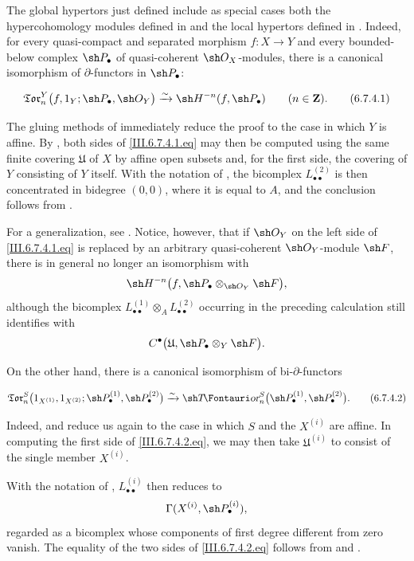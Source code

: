 \begin{remark}[6.7.4]
\label{III.6.7.4}
The global hypertors just defined include as special cases both
the hypercohomology modules defined in  and the
local hypertors defined in .  Indeed, for every
quasi-compact and separated morphism $f:X\to Y$ and every
bounded-below complex $\sh P_\bullet$ of quasi-coherent
$\sh O_X$-modules, there is a canonical isomorphism of
$\partial$-functors in $\sh P_\bullet$:
\begin{env}[6.7.4.1]
\label{III.6.7.4.1}
\[
  \mathfrak{Tor}_n^Y
  \bigl(
    f,1_Y;
    \sh P_\bullet,\sh O_Y
  \bigr)
  \xrightarrow{\sim}
  \sh H^{-n}(f,\sh P_\bullet)
  \qquad(n\in\mathbf Z).
  \tag{6.7.4.1}\label{III.6.7.4.1.eq}
\]
\end{env}
The gluing methods of  immediately reduce the
proof to the case in which $Y$ is affine.  By
, both sides of
\eqref{III.6.7.4.1.eq} may then be computed using the same
finite covering $\mathfrak U$ of $X$ by affine open subsets and,
for the first side, the covering of $Y$ consisting of $Y$
itself.  With the notation of , the bicomplex
$L_{\bullet\bullet}^{(2)}$ is then concentrated in bidegree
$(0,0)$, where it is equal to $A$, and the conclusion follows
from .

For a generalization, see .  Notice, however,
that if $\sh O_Y$ on the left side of
\eqref{III.6.7.4.1.eq} is replaced by an arbitrary
quasi-coherent $\sh O_Y$-module $\sh F$, there is in general no
longer an isomorphism with
\[
  \sh H^{-n}
  \bigl(
    f,\sh P_\bullet\otimes_{\sh O_Y}\sh F
  \bigr),
\]
although the bicomplex
$L_{\bullet\bullet}^{(1)}\otimes_A
 L_{\bullet\bullet}^{(2)}$ occurring in the preceding
calculation still identifies with
\[
  C^\bullet
  \bigl(
    \mathfrak U,
    \sh P_\bullet\otimes_Y\sh F
  \bigr).
\]

On the other hand, there is a canonical isomorphism of
bi-$\partial$-functors
\begin{env}[6.7.4.2]
\label{III.6.7.4.2}
\[
  \mathfrak{Tor}_n^S
  \bigl(
    1_{X^{(1)}},1_{X^{(2)}};
    \sh P_\bullet^{(1)},\sh P_\bullet^{(2)}
  \bigr)
  \xrightarrow{\sim}
  \shTor_n^S
  \bigl(
    \sh P_\bullet^{(1)},\sh P_\bullet^{(2)}
  \bigr).
  \tag{6.7.4.2}\label{III.6.7.4.2.eq}
\]
\end{env}
Indeed,  and  reduce us again to
the case in which $S$ and the $X^{(i)}$ are affine.  In
computing the first side of \eqref{III.6.7.4.2.eq}, we may then
take $\mathfrak U^{(i)}$ to consist of the single member
$X^{(i)}$.


With the notation of ,
$L_{\bullet\bullet}^{(i)}$ then reduces to
\[
  \Gamma(X^{(i)},\sh P_\bullet^{(i)}),
\]
regarded as a bicomplex whose components of first degree
different from zero vanish.  The equality of the two sides of
\eqref{III.6.7.4.2.eq} follows from  and
.
\end{remark}

